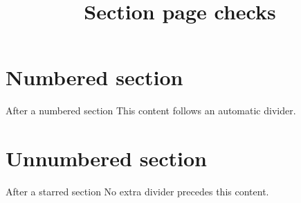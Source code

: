\documentclass[aspectratio=169,11pt,t]{beamer}
\title[Section checks]{Section page checks}
\author{}
\date{}
\begin{document}
\cityutitlepage
\section{Numbered section}
\begin{frame}{After a numbered section}
  This content follows an automatic divider.
\end{frame}
\section*{Unnumbered section}
\begin{frame}{After a starred section}
  No extra divider precedes this content.
\end{frame}
\end{document}

